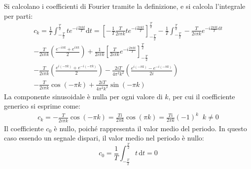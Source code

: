 \documentclass{article}
\newcommand{\df}{\mathrm{d}}
\begin{document}
Si calcolano i coefficienti di Fourier tramite la definizione, e si calcola l'integrale per parti: 
\begin{gather*}
    c_k=\displaystyle\frac{1}{T}\int_{-\frac{T}{2}}^{\frac{T}{2}}te^{-i\frac{2\pi kt}{T}}\df t=\displaystyle\left[-\frac{1}{T}\frac{T}{2i\pi k}te^{-i\frac{2\pi kt}{T}}\right]_{-\frac{T}{2}}^{\frac{T}{2}}-
    \frac{1}{T}\int_{-\frac{T}{2}}^{\frac{T}{2}}-\frac{T}{2i\pi k}e^{-i\frac{2\pi kt}{T}\df t}\\
    \displaystyle-\frac{T}{2i\pi k}\left(\frac{e^{-i\pi k}+e^{i\pi k}}{2}\right)+\frac{1}{2i\pi k}\left[\frac{T}{2i\pi k}e^{-i\frac{2\pi kt}{T}}\right]_{-\frac{T}{2}}^{\frac{T}{2}}\\
    \displaystyle-\frac{T}{2i\pi k}\left(\frac{e^{i(-\pi k)}+e^{-i(-\pi k)}}{2}\right)-\frac{2iT}{4\pi^2k^2}\left(\frac{e^{i(-\pi k)}-e^{-i(-\pi k)}}{2i}\right)\\
    \displaystyle-\frac{T}{2i\pi k}\cos\left(-\pi k\right)+\frac{2iT}{4\pi^2k^2}\sin(-\pi k)
\end{gather*}
La componente sinusoidale è nulla per ogni valore di $k$, per cui il coefficiente generico si esprime come:
\begin{gather}
    c_k=\displaystyle-\frac{T}{2i\pi k}\cos(-\pi k)=\frac{Ti}{2\pi k}\cos(\pi k)=\frac{Ti}{2\pi k}(-1)^k \;\;k\neq0
\end{gather}
Il coefficiente $c_0$ è nullo, poiché rappresenta il valor medio del periodo. In questo caso essendo un segnale dispari, il valor medio nel periodo è nullo:
\begin{equation}
    c_0=\displaystyle\frac{1}{T}\int_{-\frac{T}{2}}^{\frac{T}{2}}t\,\df t=0
\end{equation}
\end{document}
